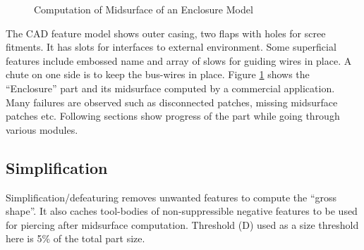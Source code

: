 \begin{figure}[!h]
\caption{Computation of Midsurface of an Enclosure Model}
\label{fig:results:enlosurebenchmark}
\end{figure}
%

The CAD feature model shows outer casing, two flaps with holes for scree fitments. It has slots for interfaces to external environment. Some superficial features include embossed name and array of slows for guiding wires in place. A chute on one side is to keep the bus-wires in place.
Figure  \ref{fig:results:enlosurebenchmark} shows the ``Enclosure'' part and its midsurface computed by a commercial application. Many failures are observed such as disconnected patches, missing midsurface patches etc. Following sections show progress of the part while going through various modules.

\subsection{Simplification}

Simplification/defeaturing removes unwanted features to compute the ``gross shape''. It also caches tool-bodies of non-suppressible negative features to be used for piercing after midsurface computation. 
Threshold (D) used as a size threshold here is 5\% of the total part size.

\def\myfigenlosuredefeaturecolumnwidth{0.95}
\def\myfigenlosuredefeatureTreecolumnwidth{0.75}

